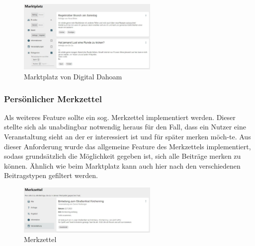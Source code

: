 \begin{figure}[h!]
    \centering
    \includegraphics[width=0.6\textwidth]{figures/andre/marktplatzvondigitaldahoam.jpg}
    \caption{Marktplatz von Digital Dahoam}
    \label{fig:marktplatzvondigitaldahoam}
\end{figure}

\subsubsection{Persönlicher Merkzettel}
Als weiteres Feature sollte ein sog. Merkzettel implementiert werden. Dieser stellte sich als unabdingbar notwendig heraus für den Fall, dass ein Nutzer eine Veranstaltung sieht an der er interessiert ist und für später merken möch-te.
Aus dieser Anforderung wurde das allgemeine Feature des Merkzettels implementiert, sodass grundsätzlich die Möglichkeit gegeben ist, sich alle Beiträge merken zu können. Ähnlich wie beim Marktplatz kann auch hier nach den verschiedenen Beitragstypen gefiltert werden.

\begin{figure}[ht!]
    \centering
    \includegraphics[width=0.6\textwidth]{figures/andre/merkzettel.jpg}
    \caption{Merkzettel}
    \label{fig:merkzettel}
\end{figure}